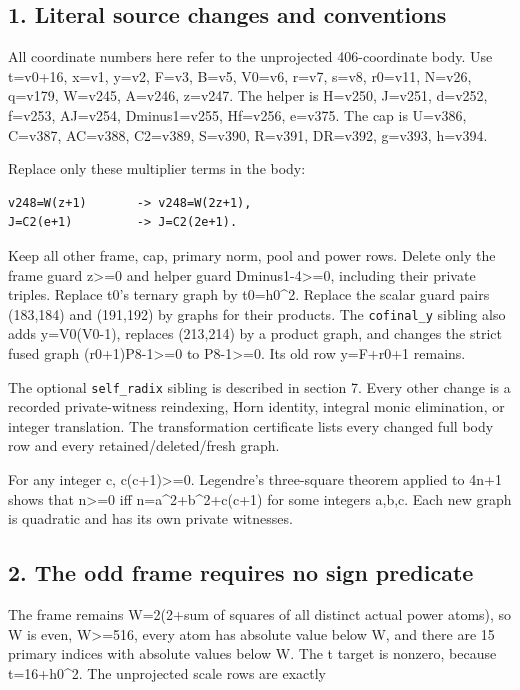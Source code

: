 \subsection{1. Literal source changes and
conventions}\label{literal-source-changes-and-conventions}

All coordinate numbers here refer to the unprojected 406-coordinate
body. Use t=v0+16, x=v1, y=v2, F=v3, B=v5, V0=v6, r=v7, s=v8, r0=v11,
N=v26, q=v179, W=v245, A=v246, z=v247. The helper is H=v250, J=v251,
d=v252, f=v253, AJ=v254, Dminus1=v255, Hf=v256, e=v375. The cap is
U=v386, C=v387, AC=v388, C2=v389, S=v390, R=v391, DR=v392, g=v393,
h=v394.

Replace only these multiplier terms in the body:

\begin{verbatim}
v248=W(z+1)       -> v248=W(2z+1),
J=C2(e+1)         -> J=C2(2e+1).
\end{verbatim}

Keep all other frame, cap, primary norm, pool and power rows. Delete
only the frame guard z\textgreater=0 and helper guard
Dminus1-4\textgreater=0, including their private triples. Replace t0's
ternary graph by t0=h0\^{}2. Replace the scalar guard pairs (183,184)
and (191,192) by graphs for their products. The \texttt{cofinal\_y}
sibling also adds y=V0(V0-1), replaces (213,214) by a product graph, and
changes the strict fused graph (r0+1)P8-1\textgreater=0 to
P8-1\textgreater=0. Its old row y=F+r0+1 remains.

The optional \texttt{self\_radix} sibling is described in section 7.
Every other change is a recorded private-witness reindexing, Horn
identity, integral monic elimination, or integer translation. The
transformation certificate lists every changed full body row and every
retained/deleted/fresh graph.

For any integer c, c(c+1)\textgreater=0. Legendre's three-square theorem
applied to 4n+1 shows that n\textgreater=0 iff n=a\^{}2+b\^{}2+c(c+1)
for some integers a,b,c. Each new graph is quadratic and has its own
private witnesses.

\subsection{2. The odd frame requires no sign
predicate}\label{the-odd-frame-requires-no-sign-predicate}

The frame remains W=2(2+sum of squares of all distinct actual power
atoms), so W is even, W\textgreater=516, every atom has absolute value
below W, and there are 15 primary indices with absolute values below W.
The t target is nonzero, because t=16+h0\^{}2. The unprojected scale
rows are exactly


